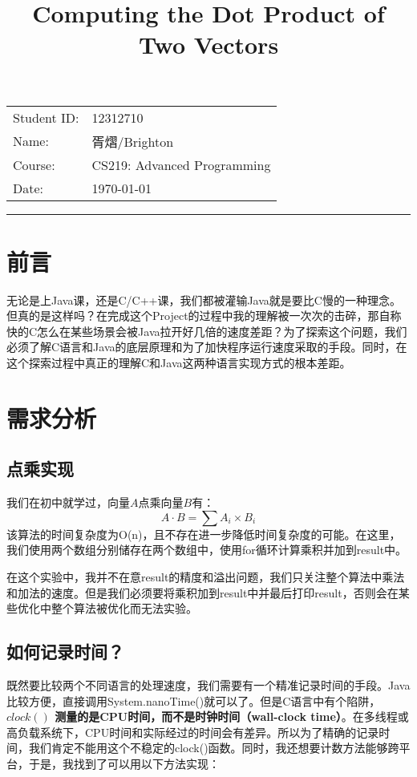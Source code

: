 \documentclass[11pt]{article}
\title{\textbf{Computing the Dot Product of Two Vectors}}
\author{} %
\date{}   %
\makeatletter
\renewcommand{\maketitle}{
  \begin{center}
    {\LARGE \@title \par} %
    \vspace{1em}
    \textbf{\@author}     %
    \vspace{1em}
    \begin{tabular}{ll}
      Student ID: & 12312710 \\
      Name:       & 胥熠/Brighton \\
      Course:     & CS219: Advanced Programming \\
      Date:       & \today
    \end{tabular}
    \vspace{0.5em}
    \hrule height 0.8pt %
  \end{center}
}
\makeatother
\begin{document}
\thispagestyle{empty}
\maketitle

{
\tableofcontents
}
\vspace{2em}
\section{前言}
无论是上Java课，还是C/C++课，我们都被灌输Java就是要比C慢的一种理念。但真的是这样吗？在完成这个Project的过程中我的理解被一次次的击碎，那自称快的C怎么在某些场景会被Java拉开好几倍的速度差距？为了探索这个问题，我们必须了解C语言和Java的底层原理和为了加快程序运行速度采取的手段。同时，在这个探索过程中真正的理解C和Java这两种语言实现方式的根本差距。

\section{需求分析}
\subsection{点乘实现}
我们在初中就学过，向量$A$点乘向量$B$有：
$$A \cdot B = \sum A_i \times B_i$$
该算法的时间复杂度为O(n)，且不存在进一步降低时间复杂度的可能。在这里，我们使用两个数组分别储存在两个数组中，使用for循环计算乘积并加到result中。


在这个实验中，我并不在意result的精度和溢出问题，我们只关注整个算法中乘法和加法的速度。但是我们必须要将乘积加到result中并最后打印result，否则会在某些优化中整个算法被优化而无法实验。

\subsection{如何记录时间？}
既然要比较两个不同语言的处理速度，我们需要有一个精准记录时间的手段。Java比较方便，直接调用System.nanoTime()就可以了。但是C语言中有个陷阱，\textbf{$clock()$ 测量的是CPU时间，而不是时钟时间（wall-clock time）}。在多线程或高负载系统下，CPU时间和实际经过的时间会有差异。所以为了精确的记录时间，我们肯定不能用这个不稳定的clock()函数。同时，我还想要计数方法能够跨平台，于是，我找到了可以用以下方法实现：
\end{document}
